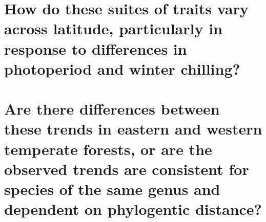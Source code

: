 \documentclass{article}\usepackage[]{graphicx}\usepackage[]{color}
\begin{document}
\section*{How do these suites of traits vary across latitude, particularly in response to differences in photoperiod and winter chilling?}
\par %

\section*{Are there differences between these trends in eastern and western temperate forests, or are the observed trends are consistent for species of the same genus and dependent on phylogentic distance?}
\par %

 
\end{document}
